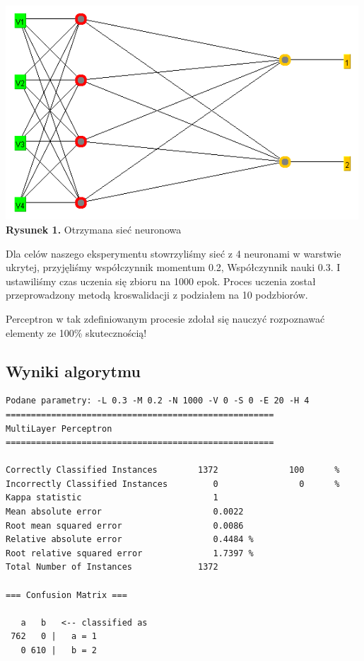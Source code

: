 \documentclass{classrep}
\begin{document}
\begin{center}
	\includegraphics[height=8cm]{siec.png}
	\textbf{Rysunek 1.} Otrzymana sieć neuronowa
\end{center}

Dla celów naszego eksperymentu stowrzyliśmy sieć z 4 neuronami w warstwie ukrytej, przyjęliśmy współczynnik momentum 0.2, Współczynnik nauki 0.3. I ustawiliśmy czas uczenia się zbioru na 1000 epok. Proces uczenia został przeprowadzony metodą kroswalidacji z podziałem na 10 podzbiorów.

Perceptron w tak zdefiniowanym procesie zdołał się nauczyć rozpoznawać elementy ze 100\% skutecznością!

\subsection{Wyniki algorytmu}
\scriptsize
\begin{verbatim}
Podane parametry: -L 0.3 -M 0.2 -N 1000 -V 0 -S 0 -E 20 -H 4 
=====================================================
MultiLayer Perceptron
=====================================================

Correctly Classified Instances        1372              100      %
Incorrectly Classified Instances         0                0      %
Kappa statistic                          1     
Mean absolute error                      0.0022
Root mean squared error                  0.0086
Relative absolute error                  0.4484 %
Root relative squared error              1.7397 %
Total Number of Instances             1372     

=== Confusion Matrix ===

   a   b   <-- classified as
 762   0 |   a = 1
   0 610 |   b = 2
\end{verbatim}
\normalsize
\end{document}
